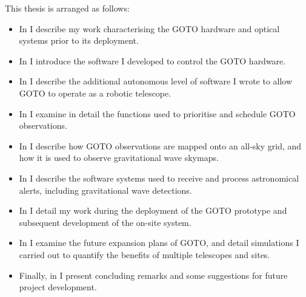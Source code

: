 \begin{colsection}
This thesis is arranged as follows:
%
\begin{itemize}
    \item In  I describe my work characterising the GOTO hardware and optical systems prior to its deployment.
    \item In  I introduce the software I developed to control the GOTO hardware.
    \item In  I describe the additional autonomous level of software I wrote to allow GOTO to operate as a robotic telescope.
    \item In  I examine in detail the functions used to prioritise and schedule GOTO observations.
    \item In  I describe how GOTO observations are mapped onto an all-sky grid, and how it is used to observe gravitational wave skymaps.
    \item In  I describe the software systems used to receive and process astronomical alerts, including gravitational wave detections.
    \item In  I detail my work during the deployment of the GOTO prototype and subsequent development of the on-site system.
    \item In  I examine the future expansion plans of GOTO, and detail simulations I carried out to quantify the benefits of multiple telescopes and sites.
    \item Finally, in  I present concluding remarks and some suggestions for future project development.
\end{itemize}

\end{colsection}

